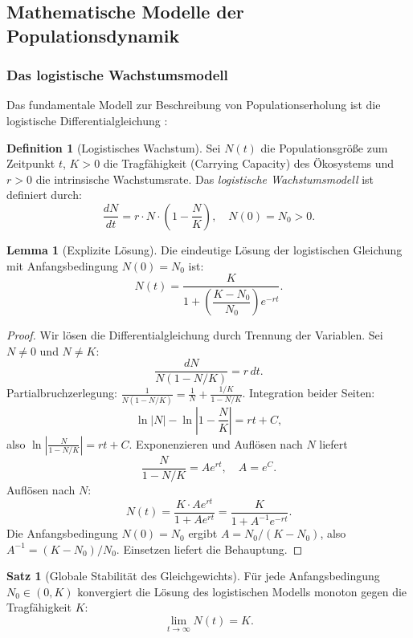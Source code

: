 ﻿\documentclass[a4paper,12pt]{article}
\theoremstyle{definition}
\newtheorem{definition}{Definition}
\newtheorem{satz}{Satz}
\newtheorem{lemma}{Lemma}
\begin{document}
\subsection{Mathematische Modelle der Populationsdynamik}

\subsubsection{Das logistische Wachstumsmodell}

Das fundamentale Modell zur Beschreibung von Populationserholung ist die logistische Differentialgleichung \cite{verhulst1838notice}:

\begin{definition}[Logistisches Wachstum]
	Sei $N(t)$ die Populationsgröße zum Zeitpunkt $t$, $K > 0$ die Tragfähigkeit (Carrying Capacity) des Ökosystems und $r > 0$ die intrinsische Wachstumsrate. Das \emph{logistische Wachstumsmodell} ist definiert durch:
	\[
	\frac{dN}{dt} = r \cdot N \cdot \left(1 - \frac{N}{K}\right), \quad N(0) = N_0 > 0.
	\]
\end{definition}

\begin{lemma}[Explizite Lösung]
	\label{lem:loesung}
	Die eindeutige Lösung der logistischen Gleichung mit Anfangsbedingung $N(0) = N_0$ ist:
	\[
	N(t) = \frac{K}{1 + \left(\dfrac{K - N_0}{N_0}\right)e^{-rt}}.
	\]
\end{lemma}

\begin{proof}
	Wir lösen die Differentialgleichung durch Trennung der Variablen. Sei $N \neq 0$ und $N \neq K$:
	\[
	\frac{dN}{N(1 - N/K)} = r\, dt.
	\]
	Partialbruchzerlegung: $\frac{1}{N(1-N/K)} = \frac{1}{N} + \frac{1/K}{1 - N/K}$.
	Integration beider Seiten:
	\[
	\ln|N| - \ln\left|1 - \frac{N}{K}\right| = rt + C,
	\]
	also $\ln\left|\frac{N}{1 - N/K}\right| = rt + C$. 
	Exponenzieren und Auflösen nach $N$ liefert
	\[
	\frac{N}{1-N/K} = A e^{rt}, \quad A = e^C.
	\]
	Auflösen nach $N$:
	\[
	N(t) = \frac{K \cdot A e^{rt}}{1 + A e^{rt}} = \frac{K}{1 + A^{-1} e^{-rt}}.
	\]
	Die Anfangsbedingung $N(0) = N_0$ ergibt $A = N_0 / (K - N_0)$, also $A^{-1} = (K-N_0)/N_0$. Einsetzen liefert die Behauptung.
\end{proof}

\begin{satz}[Globale Stabilität des Gleichgewichts]
	\label{satz:stabilitaet}
	Für jede Anfangsbedingung $N_0 \in (0, K)$ konvergiert die Lösung des logistischen Modells monoton gegen die Tragfähigkeit $K$:
	\[
	\lim_{t \to \infty} N(t) = K.
	\]
\end{satz}
\end{document}
